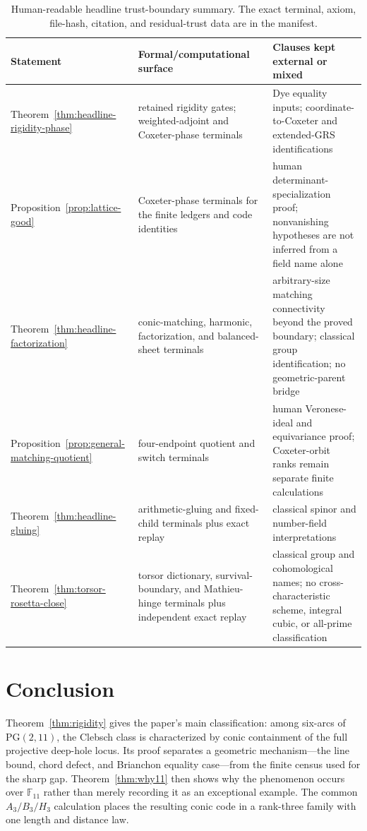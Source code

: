 \documentclass[11pt]{article}
\theoremstyle{definition}
\theoremstyle{remark}
\newcommand{\PG}{\mathrm{PG}}
\newcommand{\F}{\mathbb{F}}
\begin{document}
\begin{table}[H]
\centering
\small
\begin{tabular}{@{}>{\raggedright\arraybackslash}p{}
                    >{\raggedright\arraybackslash}p{}
                    >{\raggedright\arraybackslash}p{}@{}}
\toprule
Statement & Formal/computational surface & Clauses kept external or mixed\\
\midrule
Theorem~\ref{thm:headline-rigidity-phase}
& retained rigidity gates; weighted-adjoint and Coxeter-phase terminals
& Dye equality inputs; coordinate-to-Coxeter and extended-GRS identifications\\
Proposition~\ref{prop:lattice-good}
& Coxeter-phase terminals for the finite ledgers and code identities
& human determinant-specialization proof; nonvanishing hypotheses are not
  inferred from a field name alone\\
Theorem~\ref{thm:headline-factorization}
& conic-matching, harmonic, factorization, and balanced-sheet terminals
& arbitrary-size matching connectivity beyond the proved boundary;
classical group identification; no geometric-parent bridge\\
Proposition~\ref{prop:general-matching-quotient}
& four-endpoint quotient and switch terminals
& human Veronese-ideal and equivariance proof; Coxeter-orbit ranks remain
  separate finite calculations\\
Theorem~\ref{thm:headline-gluing}
& arithmetic-gluing and fixed-child terminals plus exact replay
& classical spinor and number-field interpretations\\
Theorem~\ref{thm:torsor-rosetta-close}
& torsor dictionary, survival-boundary, and Mathieu-hinge terminals plus
independent exact replay
& classical group and cohomological names; no cross-characteristic scheme,
integral cubic, or all-prime classification\\
\bottomrule
\end{tabular}
\caption{Human-readable headline trust-boundary summary.  The exact terminal,
axiom, file-hash, citation, and residual-trust data are in the manifest.}
\end{table}

\section*{Conclusion}

Theorem~\ref{thm:rigidity} gives the paper's main classification: among
six-arcs of $\PG(2,11)$, the Clebsch class is characterized by conic
containment of the full projective deep-hole locus.  Its proof separates a
geometric mechanism---the line bound, chord defect, and Brianchon
equality case---from the finite census used for the sharp gap.
Theorem~\ref{thm:why11} then shows why the phenomenon occurs over
$\F_{11}$ rather than merely recording it as an exceptional example.  The
common $A_3/B_3/H_3$ calculation places the resulting conic code in a
rank-three family with one length and distance law.
\end{document}
